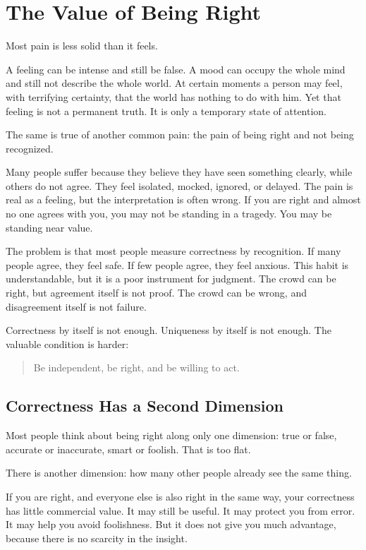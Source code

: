 \chapter{The Value of Being Right}

Most pain is less solid than it feels.

A feeling can be intense and still be false. A mood can occupy the whole mind and still not describe the whole world. At certain moments a person may feel, with terrifying certainty, that the world has nothing to do with him. Yet that feeling is not a permanent truth. It is only a temporary state of attention.

The same is true of another common pain: the pain of being right and not being recognized.

Many people suffer because they believe they have seen something clearly, while others do not agree. They feel isolated, mocked, ignored, or delayed. The pain is real as a feeling, but the interpretation is often wrong. If you are right and almost no one agrees with you, you may not be standing in a tragedy. You may be standing near value.

The problem is that most people measure correctness by recognition. If many people agree, they feel safe. If few people agree, they feel anxious. This habit is understandable, but it is a poor instrument for judgment. The crowd can be right, but agreement itself is not proof. The crowd can be wrong, and disagreement itself is not failure.

Correctness by itself is not enough. Uniqueness by itself is not enough. The valuable condition is harder:

\begin{quote}
Be independent, be right, and be willing to act.
\end{quote}

\section*{Correctness Has a Second Dimension}

Most people think about being right along only one dimension: true or false, accurate or inaccurate, smart or foolish. That is too flat.

There is another dimension: how many other people already see the same thing.

If you are right, and everyone else is also right in the same way, your correctness has little commercial value. It may still be useful. It may protect you from error. It may help you avoid foolishness. But it does not give you much advantage, because there is no scarcity in the insight.

